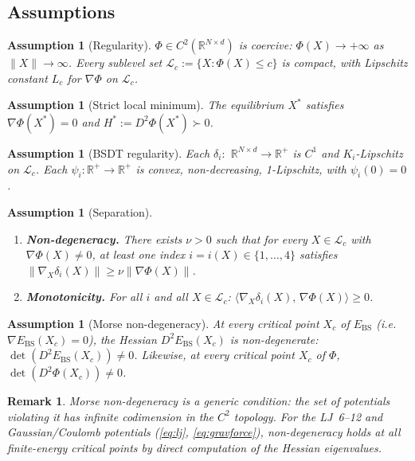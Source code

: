 \documentclass[final]{siamltex}
\newcommand{\R}{\mathbb{R}}
\newcommand{\norm}[1]{\lVert #1 \rVert}
\newcommand{\inner}[2]{\langle #1,\, #2 \rangle}
\providecommand{\grad}{\nabla}
\newcommand{\Ebs}{E_{\mathrm{BS}}}
\newcommand{\Xst}{X^*}
\newtheorem{assumption}[theorem]{Assumption}
\newtheorem{remark}[theorem]{Remark}
\begin{document}
\subsection{Assumptions}

\begin{assumption}[Regularity]\label{ass:reg}
$\Phi\in C^2(\R^{N\times d})$ is coercive: $\Phi(X)\to+\infty$ as
$\norm{X}\to\infty$. Every sublevel set $\mathcal{L}_c:=
\{X:\Phi(X)\le c\}$ is compact, with Lipschitz constant $L_c$ for
$\grad\Phi$ on $\mathcal{L}_c$.
\end{assumption}

\begin{assumption}[Strict local minimum]\label{ass:equil}
The equilibrium $\Xst$ satisfies $\grad\Phi(\Xst)=0$ and
$H^*:=D^2\Phi(\Xst)\succ 0$.
\end{assumption}

\begin{assumption}[BSDT regularity]\label{ass:bsdt}
Each $\delta_i:$ $\R^{N\times d}\to\R^+$ is $C^1$ and
$K_i$-Lipschitz on $\mathcal{L}_c$. Each $\psi_i:\R^+\to\R^+$ is
convex, non-decreasing, 1-Lipschitz, with $\psi_i(0)=0$.
\end{assumption}

\begin{assumption}[Separation]\label{ass:sep}
\begin{enumerate}
\item[\textup{(S1)}] \textbf{Non-degeneracy.}
  There exists $\nu>0$ such that for every $X\in\mathcal{L}_c$
  with $\grad\Phi(X)\neq 0$, at least one index
  $i=i(X)\in\{1,\ldots,4\}$ satisfies
  $\norm{\grad_X\delta_i(X)}\ge\nu\norm{\grad\Phi(X)}$.
\item[\textup{(S2)}] \textbf{Monotonicity.}
  For all $i$ and all $X\in\mathcal{L}_c$:
  $\inner{\grad_X\delta_i(X)}{\grad\Phi(X)}\ge 0$.
\end{enumerate}
\end{assumption}

\begin{assumption}[Morse non-degeneracy]\label{ass:morse}
At every critical point $X_c$ of $\Ebs$ (i.e.\ $\grad\Ebs(X_c)=0$),
the Hessian $D^2\Ebs(X_c)$ is non-degenerate:
$\det(D^2\Ebs(X_c))\neq 0$.  Likewise, at every critical point
$X_c$ of $\Phi$, $\det(D^2\Phi(X_c))\neq 0$.
\end{assumption}

\begin{remark}\label{rem:morse_generic}
Morse non-degeneracy is a generic condition: the set of potentials
violating it has infinite codimension in the $C^2$ topology.  For
the LJ~6--12 and Gaussian/Coulomb potentials
(\eqref{eq:lj}, \eqref{eq:gravforce}), non-degeneracy holds at
all finite-energy critical points by direct computation of the
Hessian eigenvalues.
\end{remark}
\end{document}
